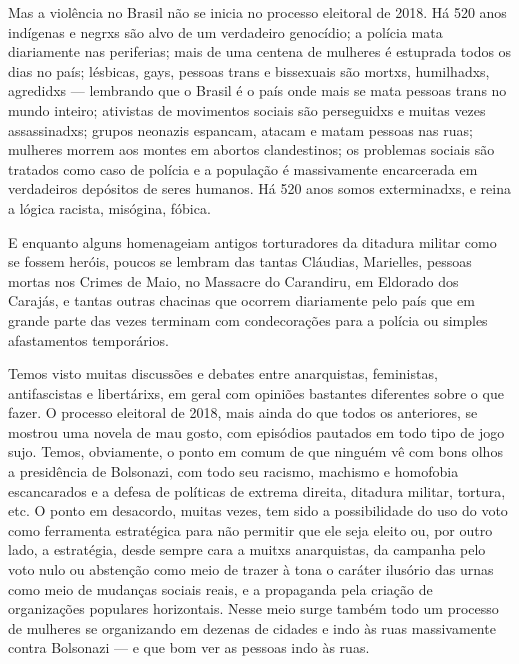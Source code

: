 Mas a violência no Brasil não se inicia no processo eleitoral de 2018. Há 520 anos indígenas e negrxs são alvo de um verdadeiro genocídio; a polícia mata diariamente nas periferias; mais de uma centena de mulheres é estuprada todos os dias no país; lésbicas, gays, pessoas trans e bissexuais são mortxs, humilhadxs, agredidxs --- lembrando que o Brasil é o país onde mais se mata pessoas trans no mundo inteiro; ativistas de movimentos sociais são perseguidxs e muitas vezes assassinadxs; grupos neonazis espancam, atacam e matam pessoas nas ruas; mulheres morrem aos montes em abortos clandestinos; os problemas sociais são tratados como caso de polícia e a população é massivamente encarcerada em verdadeiros depósitos de seres humanos. Há 520 anos somos exterminadxs, e reina a lógica racista, misógina, fóbica.

E enquanto alguns homenageiam antigos torturadores da ditadura militar como se fossem heróis, poucos se lembram das tantas Cláudias, Marielles, pessoas mortas nos Crimes de Maio, no Massacre do Carandiru, em Eldorado dos Carajás, e tantas outras chacinas que ocorrem diariamente pelo país que em grande parte das vezes terminam com condecorações para a polícia ou simples afastamentos temporários.

Temos visto muitas discussões e debates entre anarquistas, feministas, antifascistas e libertárixs, em geral com opiniões bastantes diferentes sobre o que fazer. O processo eleitoral de 2018, mais ainda do que todos os anteriores, se mostrou uma novela de mau gosto, com episódios pautados em todo tipo de jogo sujo. Temos, obviamente, o ponto em comum de que ninguém vê com bons olhos a presidência de Bolsonazi, com todo seu racismo, machismo e homofobia escancarados e a defesa de políticas de extrema direita, ditadura militar, tortura, etc.
O ponto em desacordo, muitas vezes, tem sido a possibilidade do uso do voto como ferramenta estratégica para não permitir que ele seja eleito ou, por outro lado, a estratégia, desde sempre cara a muitxs anarquistas, da campanha pelo voto nulo ou abstenção como meio de trazer à tona o caráter ilusório das urnas como meio de mudanças sociais reais, e a propaganda pela criação de organizações populares horizontais. Nesse meio surge também todo um processo de mulheres se organizando em dezenas de cidades e indo às ruas massivamente contra Bolsonazi --- e que bom ver as pessoas indo às ruas.

